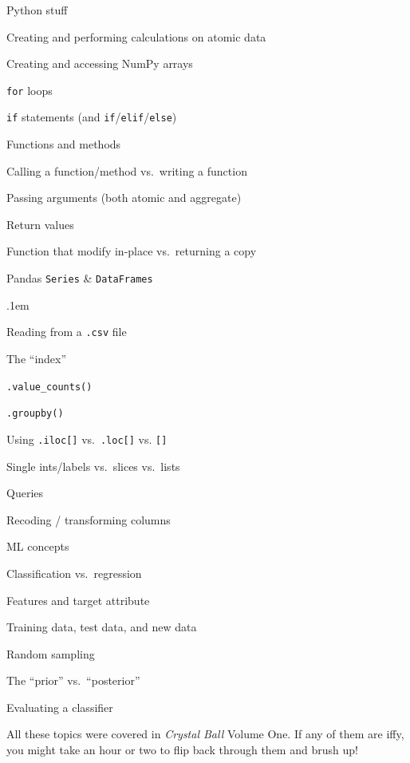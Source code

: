 \begin{compactitem}
\item Python stuff
    \begin{compactitem}
    \item Creating and performing calculations on atomic data
    \item Creating and accessing NumPy arrays
    \item \texttt{for} loops
    \item \texttt{if} statements (and \texttt{if}/\texttt{elif}/\texttt{else})
    \item Functions and methods
        \begin{compactitem}
        \item Calling a function/method vs.~writing a function
        \item Passing arguments (both atomic and aggregate)
        \item Return values
        \item Function that modify in-place vs.~returning a copy
        \end{compactitem}

    \item Pandas \texttt{Series} \& \texttt{DataFrames}
        \begin{compactitem}
        \itemsep.1em
        \item Reading from a \texttt{.csv} file
        \item The ``index''
        \item \texttt{.value\_counts()}
        \item \texttt{.groupby()}
        \item Using \texttt{.iloc[]} vs.~\texttt{.loc[]} vs. \texttt{[]}
        \item Single ints/labels vs.~slices vs.~lists
        \item Queries
        \item Recoding / transforming columns
        \end{compactitem}
    \end{compactitem}

\item ML concepts
    \begin{compactitem}
    \item Classification vs.~regression
    \item Features and target attribute
    \item Training data, test data, and new data
    \item Random sampling
    \item The ``prior'' vs.~``posterior''
    \item Evaluating a classifier
    \end{compactitem}

\end{compactitem}

All these topics were covered in \textit{Crystal Ball} Volume One. If any of
them are iffy, you might take an hour or two to flip back through them and
brush up!
